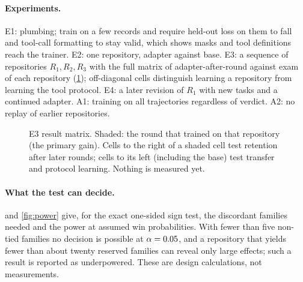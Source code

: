 \paragraph{Experiments.} E1: plumbing; train on a few records and require held-out loss on
them to fall and tool-call formatting to stay valid, which shows masks and tool
definitions reach the trainer. E2: one repository, adapter against base. E3: a sequence of
repositories $R_1,R_2,R_3$ with the full matrix of adapter-after-round against exam of each
repository (\cref{fig:matrix}); off-diagonal cells distinguish learning a repository from
learning the tool protocol. E4: a later revision of $R_1$ with new tasks and a continued
adapter. A1: training on all trajectories regardless of verdict. A2: no replay of earlier
repositories.

\begin{figure}[t]
\centering
{}
\caption{E3 result matrix. Shaded: the round that trained on that repository (the
primary gain). Cells to the right of a shaded cell test retention after later rounds; cells to its left
(including the base) test transfer and protocol learning. Nothing is measured yet.}\label{fig:matrix}
\end{figure}

\paragraph{What the test can decide.}  and \cref{fig:power} give, for the
exact one-sided sign test, the discordant families needed and the power at assumed win
probabilities. With fewer than five non-tied families no decision is possible at
$\alpha=0.05$, and a repository that yields fewer than about twenty reserved
families can reveal only large effects; such a result is reported as underpowered.
These are design calculations, not measurements.

